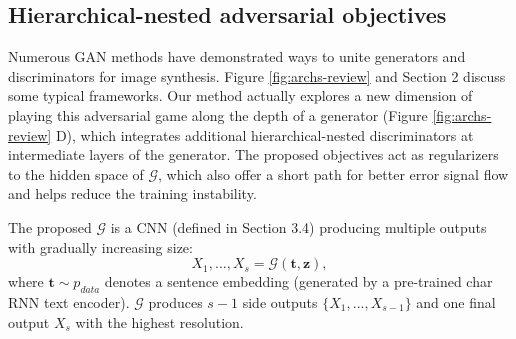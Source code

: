 \documentclass[10pt,twocolumn,letterpaper]{article}
\begin{document}
\subsection{Hierarchical-nested adversarial objectives}
Numerous GAN methods have demonstrated ways to unite generators and discriminators for image synthesis. Figure \ref{fig:archs-review} and Section 2 discuss some typical frameworks.
Our method actually explores a new dimension of playing this adversarial game along the depth of a generator (Figure \ref{fig:archs-review} D), which integrates additional hierarchical-nested discriminators at intermediate layers of the generator. 
The proposed objectives act as regularizers to the hidden space of $\mathcal{G}$, which also offer a short path for better error signal flow and helps reduce the training instability.

The proposed $\mathcal{G}$ is a CNN (defined in Section 3.4) producing multiple outputs with gradually increasing size:
\begin{equation}
\label{side}
X_1,..., X_s = \mathcal{G}(\bm t, \bm z), 
\end{equation}
where  $\bm t\sim p_{data}$ denotes a sentence embedding (generated by a pre-trained char RNN text encoder\cite{reed2016generative}). $\mathcal{G}$ produces $s-1$ side outputs $\{X_1,...,X_{s-1}\}$  and one final output $X_s$ with the highest resolution.



\end{document}
